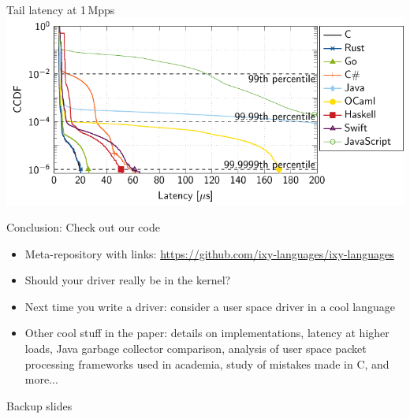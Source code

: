 \documentclass[NET,english,aspectratio=169,notitleframe]{tumbeamer}
\begin{document}
\begin{frame}{Tail latency at 1\,Mpps}
\hspace{1.7cm}\includegraphics[scale=1]{figures/latency-1/latency-ccdf-9.pdf}
\end{frame}





\begin{frame}{Conclusion: Check out our code}
\begin{itemize}
\item Meta-repository with links: \url{https://github.com/ixy-languages/ixy-languages}
\item Should your driver really be in the kernel?
\item Next time you write a driver: consider a user space driver in a cool language
\vspace{1ex}
\item Other cool stuff in the paper: details on implementations, latency at higher loads, Java garbage collector comparison, analysis of user space packet processing frameworks used in academia, study of mistakes made in C, and more...
\end{itemize}
\end{frame}

\begin{frame}
\centering\Huge Backup slides
\end{frame}
\end{document}
